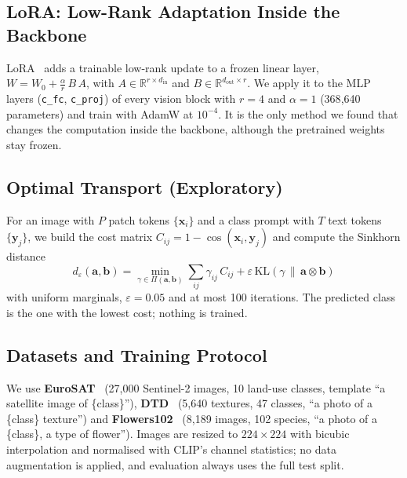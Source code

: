 \documentclass[10pt,twocolumn,letterpaper]{article}
\begin{document}
\subsection{LoRA: Low-Rank Adaptation Inside the Backbone}\label{sec:lora}

LoRA~\cite{hu2022lora} adds a trainable low-rank update to a frozen linear
layer, $W = W_0 + \frac{\alpha}{r}\,B\,A$, with
$A \in \mathbb{R}^{r \times d_{\mathrm{in}}}$ and
$B \in \mathbb{R}^{d_{\mathrm{out}} \times r}$.  We apply it to the MLP
layers (\texttt{c\_fc}, \texttt{c\_proj}) of every vision block with
$r = 4$ and $\alpha = 1$ (368{,}640 parameters) and train with AdamW at
$10^{-4}$.  It is the only method we found that changes the computation inside the
backbone, although the pretrained weights stay frozen.

\subsection{Optimal Transport (Exploratory)}\label{sec:ot}

For an image with $P$ patch tokens $\{\mathbf{x}_i\}$ and a class prompt
with $T$ text tokens $\{\mathbf{y}_j\}$, we build the cost matrix
$C_{ij} = 1 - \cos(\mathbf{x}_i, \mathbf{y}_j)$ and compute the Sinkhorn
distance~\cite{cuturi2013sinkhorn}
\begin{equation}\label{eq:sinkhorn}
  d_{\varepsilon}(\mathbf{a}, \mathbf{b})
    = \min_{\gamma \in \Pi(\mathbf{a}, \mathbf{b})}
      \sum_{ij} \gamma_{ij}\,C_{ij}
      + \varepsilon\,\mathrm{KL}(\gamma \,\|\, \mathbf{a} \otimes \mathbf{b})
\end{equation}
with uniform marginals, $\varepsilon = 0.05$ and at most 100 iterations.
The predicted class is the one with the lowest cost; nothing is trained.

\subsection{Datasets and Training Protocol}\label{sec:protocol}

We use \textbf{EuroSAT}~\cite{helber2019eurosat} (27{,}000 Sentinel-2
images, 10 land-use classes, template ``a satellite image of \{class\}''),
\textbf{DTD}~\cite{cimpoi2014describing} (5{,}640 textures, 47 classes,
``a photo of a \{class\} texture'') and
\textbf{Flowers102}~\cite{nilsback2008automated} (8{,}189 images, 102
species, ``a photo of a \{class\}, a type of flower'').  Images are resized
to $224 \times 224$ with bicubic interpolation and normalised with CLIP's
channel statistics; no data augmentation is applied, and evaluation always
uses the full test split.
\end{document}
